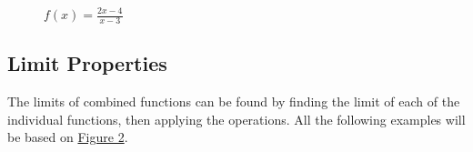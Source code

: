 \documentclass[12pt]{article}
\begin{document}
\begin{figure}[H]
    \begin{center}
        \caption{$f(x) = \frac{2x-4}{x-3}$}
        \label{fig:limasymptote}
    \end{center}
\end{figure}

\subsection{Limit Properties}
The limits of combined functions can be found by finding the limit of each of the individual functions, then applying the operations. All the following examples will be based on \hyperref[fig:limasymptote]{Figure 2}.
\end{document}
